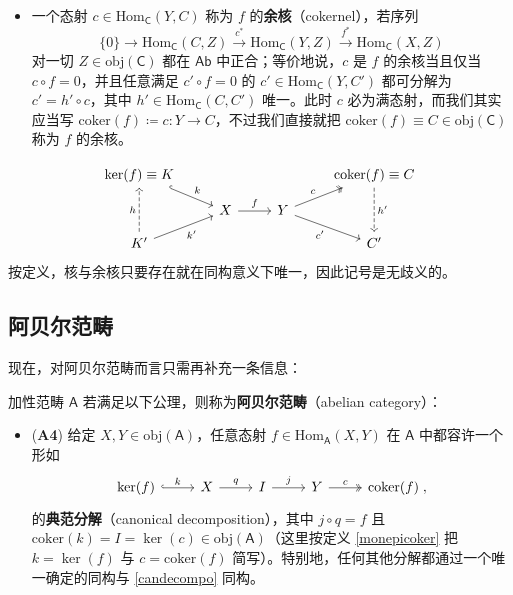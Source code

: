 \begin{Def}
\begin{itemize}[leftmargin=0.5cm]
		\item 一个态射 $c\in\text{Hom}_\mathsf{C}(Y,C)$ 称为 $f$ 的\textbf{余核}（cokernel），若序列
		\[
		\{0\}\rightarrow\text{Hom}_\mathsf{C}(C,Z)\xrightarrow{c^*}\text{Hom}_\mathsf{C}(Y,Z)\xrightarrow{f^*}\text{Hom}_\mathsf{C}(X,Z)
		\]
		对一切 $Z\in\text{obj}(\mathsf{C})$ 都在 $\mathsf{Ab}$ 中正合；等价地说，$c$ 是 $f$ 的余核当且仅当 $c\circ f=0$，并且任意满足 $c'\circ f= 0$ 的 $c'\in\text{Hom}_\mathsf{C}(Y,C')$ 都可分解为 $c'=h'\circ c$，其中 $h'\in\text{Hom}_\mathsf{C}(C,C')$ 唯一。此时 $c$ 必为满态射，而我们其实应当写 $\text{coker}(f)\coloneqq c:Y\rightarrow C$，不过我们直接就把 $\text{coker}(f)\equiv C\in\text{obj}(\mathsf{C})$ 称为 $f$ 的余核。
	\end{itemize}
	\begin{equation}\label{kercokerdiag}
		\begin{tikzcd}[row sep=small]
			\ker(f)\equiv K\arrow[dr, hook, "k"] & & & \text{coker}(f)\equiv C\arrow[dd, dashed, "h'"] \\
			& X\arrow[r, "f"] & Y\arrow[ur, two heads, "c"]\arrow[dr, "c'"'] & \\
			K'\arrow[uu, dashed, "h"]\arrow[ur, "k'"'] & & & C' 
		\end{tikzcd}
	\end{equation}
	按定义，核与余核只要存在就在同构意义下唯一，因此记号是无歧义的。
\end{Def}   


\subsection{阿贝尔范畴}\label{ch1.2}


现在，对阿贝尔范畴而言只需再补充一条信息：

\begin{Def}\label{abcat}
	加性范畴 $\mathsf{A}$ 若满足以下公理，则称为\textbf{阿贝尔范畴}（abelian category）：
	\begin{itemize}[leftmargin=0.5cm]
		\renewcommand{\labelitemi}{\textendash}
		\item (\textbf{A4}) 给定 $X,Y\in\text{obj}(\mathsf{A})$，任意态射 $f\in\text{Hom}_\mathsf{A}(X,Y)$ 在 $\mathsf{A}$ 中都容许一个形如
		\begin{equation}\label{candecompo}
			\begin{tikzcd}
				\ker(f)\arrow[r, hook, "k"] & X\arrow[r, "q"] & I\arrow[r, "j"] & Y\arrow[r, two heads, "c"] & \text{coker}(f)\;,
			\end{tikzcd}
		\end{equation}
		的\textbf{典范分解}（canonical decomposition），其中 $j\circ q=f$ 且 $\text{coker}(k)=I=\ker(c)\in\text{obj}(\mathsf{A})$（这里按定义 \ref{monepicoker} 把 $k=\ker(f)$ 与 $c=\text{coker}(f)$ 简写）。特别地，任何其他分解都通过一个唯一确定的同构与 \eqref{candecompo} 同构。
	\end{itemize}
\end{Def}

